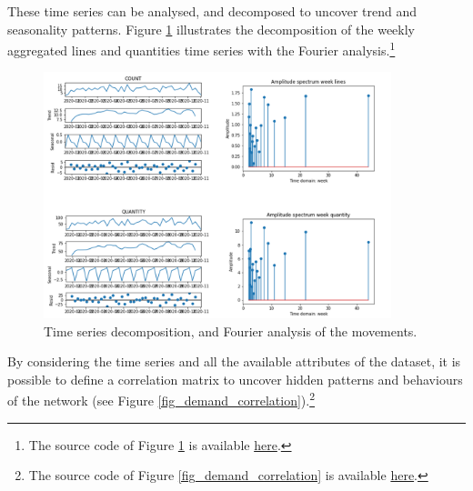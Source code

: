These time series can be analysed, and decomposed to uncover trend and seasonality patterns. Figure \ref{fig_demandDecomposition} illustrates the decomposition of the weekly aggregated lines and quantities time series with the Fourier analysis.\footnote{The source code of Figure \ref{fig_demandDecomposition} is available \href{https://github.com/aletuf93/logproj/blob/master/examples/LOG_01\%20Demand\%20assessment.ipynb}{here}.}

\begin{figure}[hbt!]
\centering
\includegraphics[width=0.9\textwidth]{SectionDistribution/control_figures/fig_demandDecomposition.png}
\captionsetup{type=figure}
\caption{Time series decomposition, and Fourier analysis of the movements.}
\label{fig_demandDecomposition}
\end{figure}

By considering the time series and all the available attributes of the dataset, it is possible to define a correlation matrix to uncover hidden patterns and behaviours of the network (see Figure \ref{fig_demand_correlation}).\footnote{The source code of Figure \ref{fig_demand_correlation} is available \href{https://github.com/aletuf93/logproj/blob/master/examples/LOG_01\%20Demand\%20assessment.ipynb}{here}.}

